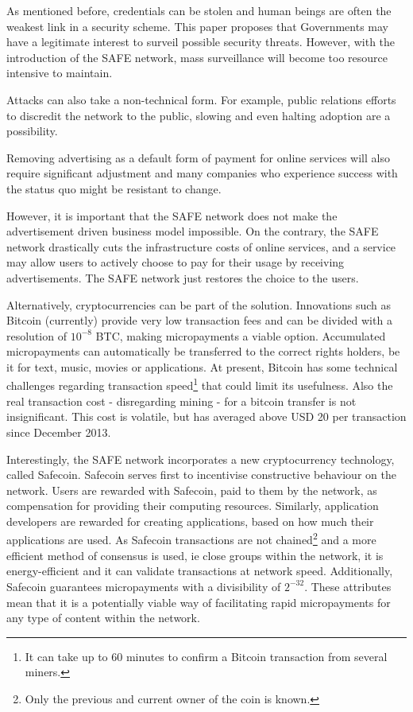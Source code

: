 \documentclass[twocolumn,english]{article}
\begin{document}
As mentioned before, credentials can be stolen and human beings are often the weakest link in a security scheme.  This paper proposes that Governments may have a legitimate interest to surveil possible security threats.  However, with the introduction of the SAFE network, mass surveillance will become too resource intensive to maintain.

Attacks can also take a non-technical
form. For example, public relations efforts to discredit the network
to the public, slowing and even halting adoption are a possibility.

Removing advertising as a default form of payment for online services will
also require significant adjustment and many companies who experience success with the status quo might be resistant to
change.

However, it is important that the SAFE network does not make the advertisement driven business model impossible.  On the contrary, the SAFE network drastically cuts the infrastructure costs of online services, and a service may allow users to actively choose to pay for their usage by receiving advertisements.  The SAFE network just restores the choice to the users.


Alternatively, cryptocurrencies can be part of the solution. Innovations such as Bitcoin (currently) provide very low transaction fees and can be divided with a resolution of $10^{-8}$ BTC, making micropayments a viable option. Accumulated micropayments can automatically be transferred to the correct rights holders, be it for text, music, movies or applications. At present, Bitcoin has some technical challenges regarding transaction speed\footnote{It can take up to 60 minutes to confirm a Bitcoin transaction from several miners.} that could limit its usefulness. Also the real transaction cost - disregarding mining - for a bitcoin transfer is not insignificant. This cost is volatile, but has averaged above USD 20 per transaction since December 2013\cite{blockchain14}.

Interestingly, the SAFE network incorporates a new cryptocurrency technology, called Safecoin.  Safecoin serves first to incentivise constructive behaviour on the network. Users are rewarded with Safecoin, paid to them by the network, as compensation for providing their computing resources. Similarly, application developers are rewarded for creating applications, based on how much their applications are used. As Safecoin transactions are not chained\footnote{Only the previous and current owner of the coin is known.} and a more efficient method of consensus is used, ie close groups within the network, it is energy-efficient and it can validate transactions at network speed. Additionally, Safecoin guarantees micropayments with a divisibility of $2^{-32}$. These attributes mean that it is a potentially viable way of facilitating rapid micropayments for any type of content within the network.
\end{document}
